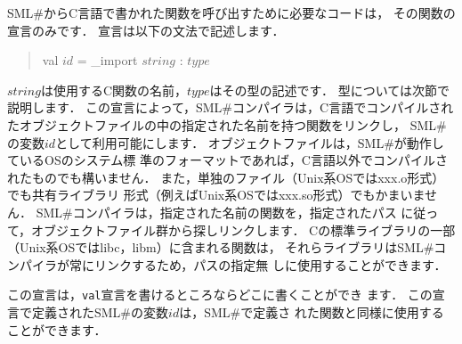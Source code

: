 \documentclass{jbook}
\newcommand{\smlsharp}{SML\#}
\newenvironment{program}{\begin{tt}\begin{quote}}{\end{quote}\end{tt}}
\begin{document}
\ifx\jp%
	\smlsharp{}からC言語で書かれた関数を呼び出すために必要なコードは，
その関数の宣言のみです．
	宣言は以下の文法で記述します．
\begin{program}
val $id$ = \_import $string$ : $type$
\end{program}
	$string$は使用するC関数の名前，$type$はその型の記述です．
	型については次節で説明します．
	この宣言によって，\smlsharp{}コンパイラは，C言語でコンパイルされ
たオブジェクトファイルの中の指定された名前を持つ関数をリンクし，
\smlsharp{}の変数$id$として利用可能にします．
	オブジェクトファイルは，\smlsharp{}が動作しているOSのシステム標
準のフォーマットであれば，C言語以外でコンパイルされたものでも構いません．
	また，単独のファイル（Unix系OSではxxx.o形式）でも共有ライブラリ
形式（例えばUnix系OSではxxx.so形式）でもかまいません．
	\smlsharp{}コンパイラは，指定された名前の関数を，指定されたパス
に従って，オブジェクトファイル群から探しリンクします．
	Cの標準ライブラリの一部（Unix系OSではlibc，libm）に含まれる関数は，
それらライブラリは\smlsharp{}コンパイラが常にリンクするため，パスの指定無
しに使用することができます．

	この宣言は，{\tt val}宣言を書けるところならどこに書くことができ
ます．
	この宣言で定義された\smlsharp{}の変数$id$は，\smlsharp{}で定義さ
れた関数と同様に使用することができます．
\end{document}
